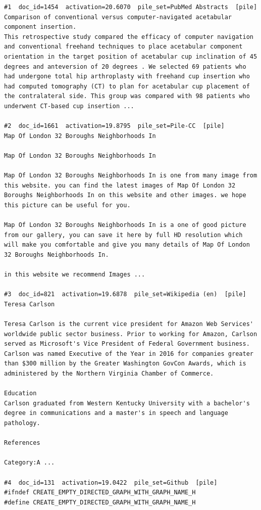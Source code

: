 \begin{verbatim}
#1  doc_id=1454  activation=20.6070  pile_set=PubMed Abstracts  [pile]
Comparison of conventional versus computer-navigated acetabular component insertion.
This retrospective study compared the efficacy of computer navigation and conventional freehand techniques to place acetabular component orientation in the target position of acetabular cup inclination of 45 degrees and anteversion of 20 degrees . We selected 69 patients who had undergone total hip arthroplasty with freehand cup insertion who had computed tomography (CT) to plan for acetabular cup placement of the contralateral side. This group was compared with 98 patients who underwent CT-based cup insertion ...

#2  doc_id=1661  activation=19.8795  pile_set=Pile-CC  [pile]
Map Of London 32 Boroughs Neighborhoods In

Map Of London 32 Boroughs Neighborhoods In

Map Of London 32 Boroughs Neighborhoods In is one from many image from this website. you can find the latest images of Map Of London 32 Boroughs Neighborhoods In on this website and other images. we hope this picture can be useful for you.

Map Of London 32 Boroughs Neighborhoods In is a one of good picture from our gallery, you can save it here by full HD resolution which will make you comfortable and give you many details of Map Of London 32 Boroughs Neighborhoods In.

in this website we recommend Images ...

#3  doc_id=821  activation=19.6878  pile_set=Wikipedia (en)  [pile]
Teresa Carlson

Teresa Carlson is the current vice president for Amazon Web Services' worldwide public sector business. Prior to working for Amazon, Carlson served as Microsoft's Vice President of Federal Government business. Carlson was named Executive of the Year in 2016 for companies greater than $300 million by the Greater Washington GovCon Awards, which is administered by the Northern Virginia Chamber of Commerce.

Education
Carlson graduated from Western Kentucky University with a bachelor's degree in communications and a master's in speech and language pathology.

References

Category:A ...

#4  doc_id=131  activation=19.0422  pile_set=Github  [pile]
#ifndef CREATE_EMPTY_DIRECTED_GRAPH_WITH_GRAPH_NAME_H
#define CREATE_EMPTY_DIRECTED_GRAPH_WITH_GRAPH_NAME_H


\end{verbatim}
